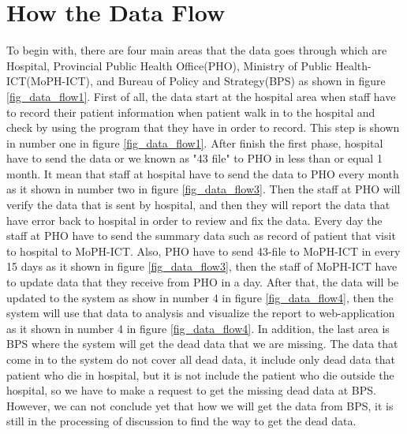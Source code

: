 \section{How the Data Flow} \label{section:how-the-data-flow}
    To begin with, there are four main areas that the data goes through which are Hospital, Provincial Public Health Office(PHO), Ministry of Public Health-ICT(MoPH-ICT), and Bureau of Policy and Strategy(BPS) as shown in figure \ref{fig_data_flow1}. First of all, the data start at the hospital area when staff have to record their patient information when patient walk in to the hospital and check  by using the program that they have in order to record. This step is shown in number one in figure \ref{fig_data_flow1}. After finish the first phase, hospital have to send the data or we known as "43 file" to PHO in less than or equal 1 month. It mean that staff at hospital have to send the data to PHO every month as it shown in number two in figure \ref{fig_data_flow3}. Then the staff at PHO will verify the data that is sent by hospital, and then they will report the data  that have error back to hospital in order to review and fix the data. Every day the staff at PHO have to send the summary data such as record of patient that visit to hospital to MoPH-ICT. Also, PHO have to send 43-file to MoPH-ICT in every 15 days as it shown in figure \ref{fig_data_flow3}, then the staff of MoPH-ICT have to update data that they receive from PHO in a day. After that, the data will be updated to the system as show in number 4 in figure \ref{fig_data_flow4}, then the system will use that data to analysis and visualize the report to web-application as it shown in number 4 in figure \ref{fig_data_flow4}. In addition, the last area is BPS where the system will get the dead data that we are missing. The data that come in to the system do not cover all dead data, it include only dead data that patient who die in hospital, but it is not include the patient who die outside the hospital, so we have to make a request to get the missing dead data at BPS. However, we can not conclude yet that how we will get the data from BPS, it is still in the processing of discussion to find the way to get the dead data.

